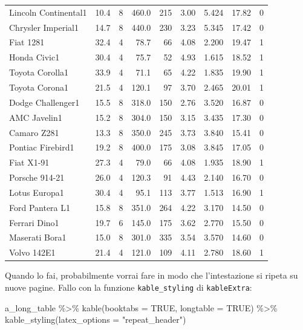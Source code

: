 \documentclass[a4paper, 11pt, nobind]{templates/ociamthesis}
\newenvironment{Shaded}{\begin{snugshade}}{\end{snugshade}}
\newcommand{\AttributeTok}[1]{\textcolor[rgb]{0.77,0.63,0.00}{#1}}
\newcommand{\ConstantTok}[1]{\textcolor[rgb]{0.00,0.00,0.00}{#1}}
\newcommand{\FunctionTok}[1]{\textcolor[rgb]{0.00,0.00,0.00}{#1}}
\newcommand{\NormalTok}[1]{#1}
\newcommand{\SpecialCharTok}[1]{\textcolor[rgb]{0.00,0.00,0.00}{#1}}
\newcommand{\StringTok}[1]{\textcolor[rgb]{0.31,0.60,0.02}{#1}}
\renewenvironment{Shaded}
{
  \vspace{10pt}%
  \begin{snugshade}%
}{%
  \end{snugshade}%
  \vspace{8pt}%
}
\begin{document}
\begin{longtable}{lrrrrrrrr}
Lincoln Continental1 & 10.4 & 8 & 460.0 & 215 & 3.00 & 5.424 & 17.82 & 0\\
Chrysler Imperial1 & 14.7 & 8 & 440.0 & 230 & 3.23 & 5.345 & 17.42 & 0\\
Fiat 1281 & 32.4 & 4 & 78.7 & 66 & 4.08 & 2.200 & 19.47 & 1\\
\addlinespace
Honda Civic1 & 30.4 & 4 & 75.7 & 52 & 4.93 & 1.615 & 18.52 & 1\\
Toyota Corolla1 & 33.9 & 4 & 71.1 & 65 & 4.22 & 1.835 & 19.90 & 1\\
Toyota Corona1 & 21.5 & 4 & 120.1 & 97 & 3.70 & 2.465 & 20.01 & 1\\
Dodge Challenger1 & 15.5 & 8 & 318.0 & 150 & 2.76 & 3.520 & 16.87 & 0\\
AMC Javelin1 & 15.2 & 8 & 304.0 & 150 & 3.15 & 3.435 & 17.30 & 0\\
\addlinespace
Camaro Z281 & 13.3 & 8 & 350.0 & 245 & 3.73 & 3.840 & 15.41 & 0\\
Pontiac Firebird1 & 19.2 & 8 & 400.0 & 175 & 3.08 & 3.845 & 17.05 & 0\\
Fiat X1-91 & 27.3 & 4 & 79.0 & 66 & 4.08 & 1.935 & 18.90 & 1\\
Porsche 914-21 & 26.0 & 4 & 120.3 & 91 & 4.43 & 2.140 & 16.70 & 0\\
Lotus Europa1 & 30.4 & 4 & 95.1 & 113 & 3.77 & 1.513 & 16.90 & 1\\
\addlinespace
Ford Pantera L1 & 15.8 & 8 & 351.0 & 264 & 4.22 & 3.170 & 14.50 & 0\\
Ferrari Dino1 & 19.7 & 6 & 145.0 & 175 & 3.62 & 2.770 & 15.50 & 0\\
Maserati Bora1 & 15.0 & 8 & 301.0 & 335 & 3.54 & 3.570 & 14.60 & 0\\
Volvo 142E1 & 21.4 & 4 & 121.0 & 109 & 4.11 & 2.780 & 18.60 & 1\\
\bottomrule
\end{longtable}

Quando lo fai, probabilmente vorrai fare in modo che l'intestazione si ripeta su nuove pagine.
Fallo con la funzione \texttt{kable\_styling} di \texttt{kableExtra}:

\begin{Shaded}
\begin{Highlighting}[]
\NormalTok{a\_long\_table }\SpecialCharTok{\%\textgreater{}\%} 
  \FunctionTok{kable}\NormalTok{(}\AttributeTok{booktabs =} \ConstantTok{TRUE}\NormalTok{, }\AttributeTok{longtable =} \ConstantTok{TRUE}\NormalTok{) }\SpecialCharTok{\%\textgreater{}\%} 
  \FunctionTok{kable\_styling}\NormalTok{(}\AttributeTok{latex\_options =} \StringTok{"repeat\_header"}\NormalTok{)}
\end{Highlighting}
\end{Shaded}
\end{document}
